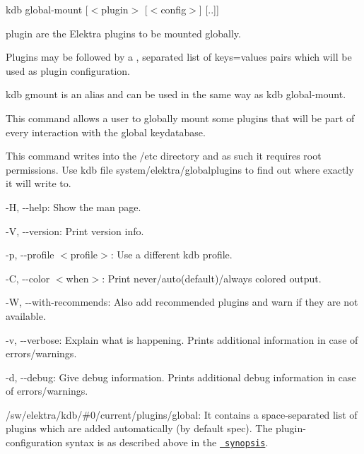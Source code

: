 {\ttfamily kdb global-\/mount \mbox{[}$<$plugin$>$ \mbox{[}$<$config$>$\mbox{]} \mbox{[}..\mbox{]}\mbox{]}}


\begin{DoxyItemize}
\item {\ttfamily plugin} are the Elektra plugins to be mounted globally.
\item Plugins may be followed by a {\ttfamily ,} separated list of {\ttfamily keys=values} pairs which will be used as plugin configuration.
\end{DoxyItemize}

{\ttfamily kdb gmount} is an alias and can be used in the same way as {\ttfamily kdb global-\/mount}.

This command allows a user to globally mount some plugins that will be part of every interaction with the global keydatabase.

This command writes into the {\ttfamily /etc} directory and as such it requires root permissions. Use {\ttfamily kdb file system/elektra/globalplugins} to find out where exactly it will write to.


\begin{DoxyItemize}
\item {\ttfamily -\/H}, {\ttfamily -\/-\/help}\+: Show the man page.
\item {\ttfamily -\/V}, {\ttfamily -\/-\/version}\+: Print version info.
\item {\ttfamily -\/p}, {\ttfamily -\/-\/profile $<$profile$>$}\+: Use a different kdb profile.
\item {\ttfamily -\/C}, {\ttfamily -\/-\/color $<$when$>$}\+: Print never/auto(default)/always colored output.
\item {\ttfamily -\/W}, {\ttfamily -\/-\/with-\/recommends}\+: Also add recommended plugins and warn if they are not available.
\item {\ttfamily -\/v}, {\ttfamily -\/-\/verbose}\+: Explain what is happening. Prints additional information in case of errors/warnings.
\item {\ttfamily -\/d}, {\ttfamily -\/-\/debug}\+: Give debug information. Prints additional debug information in case of errors/warnings.
\end{DoxyItemize}


\begin{DoxyItemize}
\item {\ttfamily /sw/elektra/kdb/\#0/current/plugins/global}\+: It contains a space-\/separated list of plugins which are added automatically (by default {\ttfamily spec}). The plugin-\/configuration syntax is as described above in the \href{\#SYNOPSIS}{\texttt{ synopsis}}.
\end{DoxyItemize}


